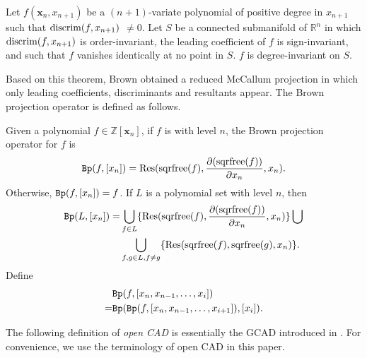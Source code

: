 \documentclass[amsthm]{elsart}
\def \Res  {{\rm Res}}
\def \discrim  {{\rm discrim}}
\def \sqrfree  {{\rm sqrfree}}
\def \Bproj  {{\tt Bp}}
\def \RR {{\mathbb R}}
\def \ZZ {{\mathbb Z}}
\newcommand{\xx}{\bm{x}}
\begin{document}
\begin{thm}\label{thm:Brown}\citep{Brown01a}
        Let $f(\xx_n,x_{n+1})$ be a $(n+1)$-variate polynomial of positive degree in $x_{n+1}$ such that $\discrim(f,x_{n+1})$ $\neq0$. Let $S$ be a connected submanifold of $\RR^n$ in which $\discrim(f,x_{n+1})$ is order-invariant, the leading coefficient of $f$ is sign-invariant, and such that $f$ vanishes identically at no point in $S$. $f$ is degree-invariant on $S$.
\end{thm}
Based on this theorem, Brown obtained a reduced McCallum projection in which only leading coefficients, discriminants and resultants appear. The Brown projection operator is defined as follows.
\begin{defn} \label{def:brown projection}\citep{Brown01a}
        Given a polynomial $f\in \ZZ[\xx_n]$, if $f$ is with level $n$,
        the Brown projection operator for $f$ is
        $$\Bproj(f,[x_{n}])=\Res(\sqrfree(f),\frac{\partial (\sqrfree(f))}{\partial x_{n}}, x_{n}).$$
        Otherwise, $\Bproj(f,[x_{n}])=f$.
        If $L$ is a polynomial set with level $n$, then
        \begin{align*}
                \Bproj(L,[x_{n}])=&\bigcup_{f\in L}\{\Res(\sqrfree(f),\frac{\partial (\sqrfree(f))}{\partial x_{n}}, x_{n})\}\bigcup\\
                &\bigcup_{f,g\in L, f\neq g}\{\Res(\sqrfree(f),\sqrfree(g),x_{n})\}.
        \end{align*}
        Define
        \begin{align*}
                &\Bproj(f,[x_{n},x_{n-1},\ldots, x_i])\\
                =&\Bproj(\Bproj(f,[x_{n},x_{n-1},\ldots,x_{i+1}]),[x_i]).
        \end{align*}
\end{defn}

The following definition of {\em open CAD\/}  is essentially the GCAD introduced in \cite{Strzebonski}. For convenience, we use the terminology of open CAD in this paper.
\end{document}
